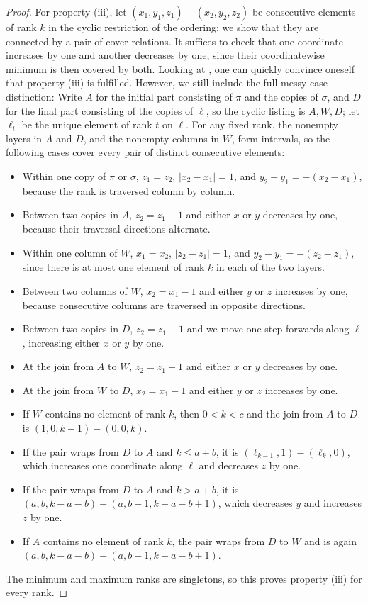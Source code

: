 \documentclass[fontsize=11pt,a4paper,DIV=12]{scrartcl}
\begin{document}
\begin{proof}
	For property (iii), let $(x_1,y_1,z_1)-(x_2,y_2,z_2)$ be consecutive elements of rank $k$ in the cyclic restriction of the ordering; we show that they are connected by a pair of cover relations. It suffices to check that one coordinate increases by one and another decreases by one, since their coordinatewise minimum is then covered by both. Looking at , one can quickly convince oneself that property (iii) is fulfilled. However, we still include the full messy case distinction: Write $A$ for the initial part consisting of $\pi$ and the copies of $\sigma$, and $D$ for the final part consisting of the copies of $\ell$, so the cyclic listing is $A,W,D$; let $\ell_t$ be the unique element of rank $t$ on $\ell$. For any fixed rank, the nonempty layers in $A$ and $D$, and the nonempty columns in $W$, form intervals, so the following cases cover every pair of distinct consecutive elements:
	\begin{itemize}
		\item Within one copy of $\pi$ or $\sigma$, $z_1=z_2$, $|x_2-x_1|=1$, and $y_2-y_1=-(x_2-x_1)$, because the rank is traversed column by column.
		\item Between two copies in $A$, $z_2=z_1+1$ and either $x$ or $y$ decreases by one, because their traversal directions alternate.
		\item Within one column of $W$, $x_1=x_2$, $|z_2-z_1|=1$, and $y_2-y_1=-(z_2-z_1)$, since there is at most one element of rank $k$ in each of the two layers.
		\item Between two columns of $W$, $x_2=x_1-1$ and either $y$ or $z$ increases by one, because consecutive columns are traversed in opposite directions.
		\item Between two copies in $D$, $z_2=z_1-1$ and we move one step forwards along $\ell$, increasing either $x$ or $y$ by one.
		\item At the join from $A$ to $W$, $z_2=z_1+1$ and either $x$ or $y$ decreases by one.
		\item At the join from $W$ to $D$, $x_2=x_1-1$ and either $y$ or $z$ increases by one.
		\item If $W$ contains no element of rank $k$, then $0<k<c$ and the join from $A$ to $D$ is $(1,0,k-1)-(0,0,k)$.
		\item If the pair wraps from $D$ to $A$ and $k\leq a+b$, it is $(\ell_{k-1},1)-(\ell_k,0)$, which increases one coordinate along $\ell$ and decreases $z$ by one.
		\item If the pair wraps from $D$ to $A$ and $k>a+b$, it is $(a,b,k-a-b)-(a,b-1,k-a-b+1)$, which decreases $y$ and increases $z$ by one.
		\item If $A$ contains no element of rank $k$, the pair wraps from $D$ to $W$ and is again $(a,b,k-a-b)-(a,b-1,k-a-b+1)$.
	\end{itemize}
	The minimum and maximum ranks are singletons, so this proves property (iii) for every rank.
\end{proof}
\end{document}
